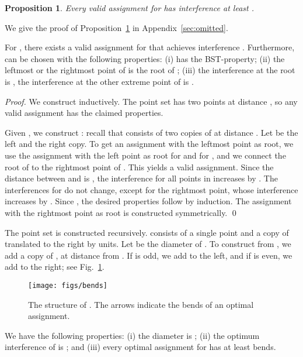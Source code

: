 \documentclass[envcountsect,envcountsame,runningheads,a4paper]{llncs}
\newtheorem{prop}[theorem]{Proposition}
\begin{document}
\begin{prop}\label{prop:lowerb}
Every valid assignment for  has interference at least
.
\end{prop}

We give the proof of Proposition~\ref{prop:lowerb} in Appendix~\ref{sec:omitted}.

\begin{lemma}\label{lem:opt_ass}
For , there exists a valid assignment  for
 that achieves interference . Furthermore,  can
be chosen with the following properties: (i)  has the \textup{BST}-property;
(ii) the leftmost or the rightmost point of  is the root
of ; (iii) the interference at the root is
, the interference at the other extreme point of  is
.
\end{lemma}

\begin{proof}
We construct  inductively. The point set 
has two points at distance , so any valid
assignment has the claimed properties.

Given , we construct : recall that 
consists of two copies of  at distance
. Let  be the left and  the right copy.
To get an assignment  with the leftmost point
as root, we use the assignment  with the left point as root
for  and for ,
and we connect the root of  to the rightmost
point of . This yields a valid assignment.
Since the distance between  and 
is , the interference for all points in
 increases by .  The interferences for
 do not change, except for the rightmost point,
whose interference increases by . Since ,
the desired properties follow by induction.
The assignment with the rightmost point as root is constructed
symmetrically.
\qed{}
\end{proof}

The point set  is constructed recursively.
 consists of a single point  and a copy 
of  translated to the right by  units.
Let  be the diameter of .
To construct  from , we add a copy  of
, at distance  from . If  is odd,
we add  to the left, and if  is even,
we add  to the right; see Fig.~\ref{fig:bends}.
\begin{figure}
\centering
\texttt{[image: figs/bends]}
\caption{The structure of . The arrows indicate the
bends of an optimal assignment.}
\label{fig:bends}
\end{figure}

\begin{theorem}
We have the following properties: (i) the diameter
 is ;
(ii) the optimum interference of  is ; and (iii) every optimal
assignment for  has at least  bends.
\end{theorem}
\end{document}
